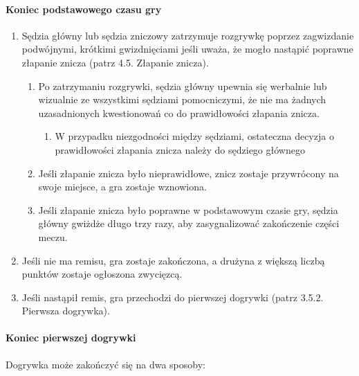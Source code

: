 \documentclass[12pt]{article}
\begin{document}
\paragraph{Koniec podstawowego czasu gry}
\begin{enumerate}
	\item Sędzia główny lub sędzia zniczowy zatrzymuje rozgrywkę poprzez
	      zagwizdanie podwójnymi, krótkimi gwizdnięciami jeśli uważa, że mogło
	      nastąpić poprawne złapanie znicza (patrz 4.5. Złapanie znicza).
	      \begin{enumerate}
		      \item Po zatrzymaniu rozgrywki, sędzia główny upewnia się werbalnie lub
		            wizualnie ze wszystkimi sędziami pomocniczymi, że nie ma żadnych
		            uzasadnionych kwestionowań co do prawidłowości złapania znicza.

		            \begin{enumerate}
			            \item
			                  W przypadku niezgodności między sędziami, ostateczna decyzja o
			                  prawidłowości złapania znicza należy do sędziego głównego
		            \end{enumerate}

		      \item Jeśli złapanie znicza było nieprawidłowe, znicz zostaje przywrócony
		            na swoje miejsce, a gra zostaje wznowiona.

		      \item Jeśli złapanie znicza było poprawne w podstawowym czasie gry,
		            sędzia główny gwiżdże długo trzy razy, aby zasygnalizować zakończenie
		            części meczu.
	      \end{enumerate}

	\item Jeśli nie ma remisu, gra zostaje zakończona, a drużyna z większą
	      liczbą punktów zostaje ogłoszona zwycięzcą.

	\item Jeśli nastąpił remis, gra przechodzi do pierwszej dogrywki (patrz
	      3.5.2. Pierwsza dogrywka).
\end{enumerate}

\paragraph{Koniec pierwszej dogrywki}
Dogrywka może zakończyć
się na dwa sposoby:
\end{document}

